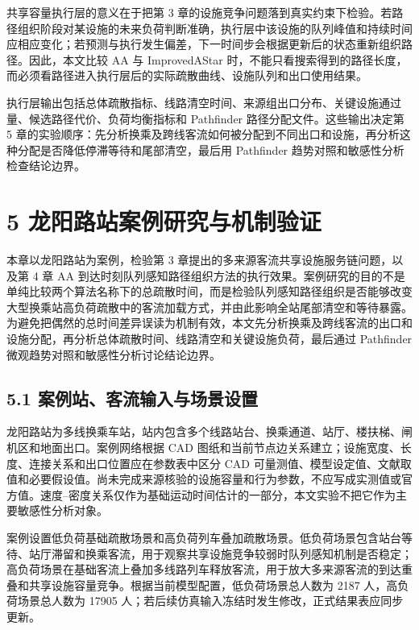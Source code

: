\documentclass[UTF8,a4paper,12pt]{ctexart}
\begin{document}
共享容量执行层的意义在于把第 3 章的设施竞争问题落到真实约束下检验。若路径组织阶段对某设施的未来负荷判断准确，执行层中该设施的队列峰值和持续时间应相应变化；若预测与执行发生偏差，下一时间步会根据更新后的状态重新组织路径。因此，本文比较 AA 与 ImprovedAStar 时，不能只看搜索得到的路径长度，而必须看路径进入执行层后的实际疏散曲线、设施队列和出口使用结果。

执行层输出包括总体疏散指标、线路清空时间、来源组出口分布、关键设施通过量、候选路径代价、负荷均衡指标和 Pathfinder 路径分配文件。这些输出决定第 5 章的实验顺序：先分析换乘及跨线客流如何被分配到不同出口和设施，再分析这种分配是否降低停滞等待和尾部清空，最后用 Pathfinder 趋势对照和敏感性分析检查结论边界。

\section{5 龙阳路站案例研究与机制验证}

本章以龙阳路站为案例，检验第 3 章提出的多来源客流共享设施服务链问题，以及第 4 章 AA 到达时刻队列感知路径组织方法的执行效果。案例研究的目的不是单纯比较两个算法名称下的总疏散时间，而是检验队列感知路径组织是否能够改变大型换乘站高负荷疏散中的客流加载方式，并由此影响全站尾部清空和等待暴露。为避免把偶然的总时间差异误读为机制有效，本文先分析换乘及跨线客流的出口和设施分配，再分析总体疏散时间、线路清空和关键设施负荷，最后通过 Pathfinder 微观趋势对照和敏感性分析讨论结论边界。

\subsection{5.1 案例站、客流输入与场景设置}

龙阳路站为多线换乘车站，站内包含多个线路站台、换乘通道、站厅、楼扶梯、闸机区和地面出口。案例网络根据 CAD 图纸和当前节点边关系建立；设施宽度、长度、连接关系和出口位置应在参数表中区分 CAD 可量测值、模型设定值、文献取值和必要假设值。尚未完成来源核验的设施容量和行为参数，不应写成实测值或官方值。速度--密度关系仅作为基础运动时间估计的一部分，本文实验不把它作为主要敏感性分析对象。

案例设置低负荷基础疏散场景和高负荷列车叠加疏散场景。低负荷场景包含站台等待、站厅滞留和换乘客流，用于观察共享设施竞争较弱时队列感知机制是否稳定；高负荷场景在基础客流上叠加多线路列车释放客流，用于放大多来源客流的到达重叠和共享设施容量竞争。根据当前模型配置，低负荷场景总人数为 2187 人，高负荷场景总人数为 17905 人；若后续仿真输入冻结时发生修改，正式结果表应同步更新。
\end{document}
